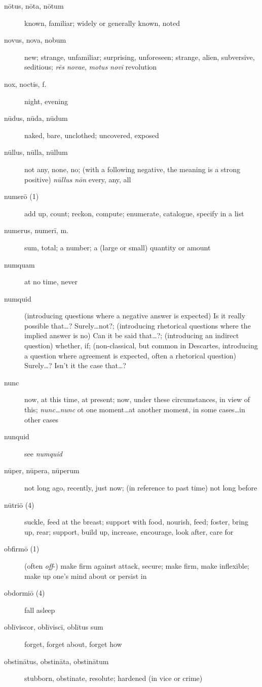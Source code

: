 \begin{description}
    \item[nōtus, nōta, nōtum] known, familiar; widely or generally known, noted
    \item[novus, nova, nobum] new; strange, unfamiliar; surprising, unforeseen; strange, alien, subversive, seditious; \textit{rēs novae}, \textit{motus novī} revolution
    \item[nox, noctis, f.] night, evening
    \item[nūdus, nūda, nūdum] naked, bare, unclothed; uncovered, exposed
    \item[nūllus, nūlla, nūllum] not any, none, no; (with a following negative, the meaning is a strong positive) \textit{nūllus nōn} every, any, all
    \item[numerō (1)] add up, count; reckon, compute; enumerate, catalogue, specify in a list
    \item[numerus, numerī, m.] sum, total; a number; a (large or small) quantity or amount
    \item[numquam] at no time, never
    \item[numquid] (introducing questions where a negative answer is expected) Is it really possible that\dots ? Surely\dots not?; (introducing rhetorical questions where the implied answer is no) Can it be said that\dots ?; (introducing an indirect question) whether, if; (non-classical, but common in Descartes, introducing a question where agreement is expected, often a rhetorical question) Surely\dots ? Isn't it the case that\dots ?
    \item[nunc] now, at this time, at present; now, under these circumstances, in view of this; \textit{nunc\dots nunc} ot one moment\dots at another moment, in some cases\dots in other cases
    \item[nunquid] see \textit{numquid}
    \item[nūper, nūpera, nūperum] not long ago, recently, just now; (in reference to past time) not long before
    \item[nūtriō (4)] suckle, feed at the breast; support with food, nourish, feed; foster, bring up, rear; support, build up, increase, encourage, look after, care for
    \item[obfirmō (1)] (often \textit{off}-) make firm against attack, secure; make firm, make inflexible; make up one's mind about or persist in
    \item[obdormiō (4)] fall asleep
    \item[oblīviscor, oblīviscī, oblītus sum] forget, forget about, forget how
    \item[obstinātus, obstināta, obstinātum] stubborn, obstinate, resolute; hardened (in vice or crime)

\end{description}
